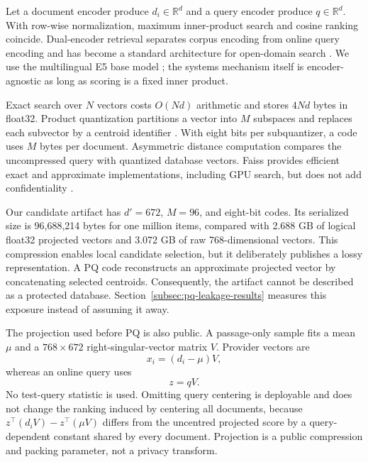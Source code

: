 \documentclass[pdflatex,sn-basic,Numbered]{sn-jnl}
\newcommand{\R}{\mathbb{R}}
\theoremstyle{plain}
\begin{document}
Let a document encoder produce $d_i\in\R^d$ and a query encoder produce $q\in\R^d$. With row-wise normalization, maximum inner-product search and cosine ranking coincide. Dual-encoder retrieval separates corpus encoding from online query encoding and has become a standard architecture for open-domain search \cite{Karpukhin2020DPR}. We use the multilingual E5 base model \cite{Wang2022E5,Wang2024MultilingualE5}; the systems mechanism itself is encoder-agnostic as long as scoring is a fixed inner product.

Exact search over $N$ vectors costs $O(Nd)$ arithmetic and stores $4Nd$ bytes in float32. Product quantization partitions a vector into $M$ subspaces and replaces each subvector by a centroid identifier \cite{Jegou2011PQ}. With eight bits per subquantizer, a code uses $M$ bytes per document. Asymmetric distance computation compares the uncompressed query with quantized database vectors. Faiss provides efficient exact and approximate implementations, including GPU search, but does not add confidentiality \cite{Johnson2019Faiss}.

Our candidate artifact has $d'=672$, $M=96$, and eight-bit codes. Its serialized size is 96,688,214 bytes for one million items, compared with 2.688 GB of logical float32 projected vectors and 3.072 GB of raw 768-dimensional vectors. This compression enables local candidate selection, but it deliberately publishes a lossy representation. A PQ code reconstructs an approximate projected vector by concatenating selected centroids. Consequently, the artifact cannot be described as a protected database. Section~\ref{subsec:pq-leakage-results} measures this exposure instead of assuming it away.

The projection used before PQ is also public. A passage-only sample fits a mean $\mu$ and a $768\times672$ right-singular-vector matrix $V$. Provider vectors are
\begin{equation}
  x_i=(d_i-\mu)V,
  \label{eq:doc-projection}
\end{equation}
whereas an online query uses
\begin{equation}
  z=qV.
  \label{eq:query-projection}
\end{equation}
No test-query statistic is used. Omitting query centering is deployable and does not change the ranking induced by centering all documents, because $z^\top(d_iV)-z^\top(\mu V)$ differs from the uncentred projected score by a query-dependent constant shared by every document. Projection is a public compression and packing parameter, not a privacy transform.
\end{document}
